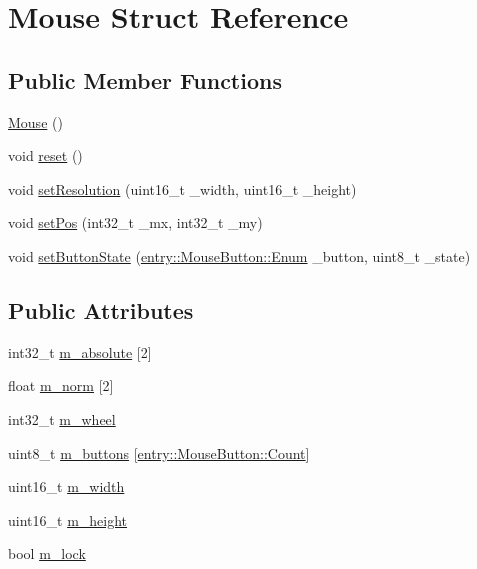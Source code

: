 \hypertarget{struct_mouse}{\section{Mouse Struct Reference}
\label{struct_mouse}
}
\subsection*{Public Member Functions}
\begin{DoxyCompactItemize}
\item 
\hyperlink{struct_mouse_a99024d3700d649ae19c1537b42a3e86d}{Mouse} ()
\item 
void \hyperlink{struct_mouse_aba60ae3aab2142aea9847a3cd59c13a5}{reset} ()
\item 
void \hyperlink{struct_mouse_aec24170b364143a8cca5e36a359e6eef}{set\+Resolution} (uint16\+\_\+t \+\_\+width, uint16\+\_\+t \+\_\+height)
\item 
void \hyperlink{struct_mouse_a8c247e14b22fa38dfae6e250c0e5d3dd}{set\+Pos} (int32\+\_\+t \+\_\+mx, int32\+\_\+t \+\_\+my)
\item 
void \hyperlink{struct_mouse_abd8a223594d0d456d7bb1f67ae176d50}{set\+Button\+State} (\hyperlink{structentry_1_1_mouse_button_a047d99f30fac4b4483eeb96d815fe54e}{entry\+::\+Mouse\+Button\+::\+Enum} \+\_\+button, uint8\+\_\+t \+\_\+state)
\end{DoxyCompactItemize}
\subsection*{Public Attributes}
\begin{DoxyCompactItemize}
\item 
int32\+\_\+t \hyperlink{struct_mouse_a42fdf956f19e9e059ca62812a082653e}{m\+\_\+absolute} \mbox{[}2\mbox{]}
\item 
float \hyperlink{struct_mouse_a1641bb4620edd76fa00092216de31820}{m\+\_\+norm} \mbox{[}2\mbox{]}
\item 
int32\+\_\+t \hyperlink{struct_mouse_a9be7ff2af5255f1fe5645496dc3b63ac}{m\+\_\+wheel}
\item 
uint8\+\_\+t \hyperlink{struct_mouse_aeacb26d4b4ad5b6bb62dccaa4ea82dc1}{m\+\_\+buttons} \mbox{[}\hyperlink{structentry_1_1_mouse_button_a047d99f30fac4b4483eeb96d815fe54ea18eab1694a20b6bed0c85d7fde907a1f}{entry\+::\+Mouse\+Button\+::\+Count}\mbox{]}
\item 
uint16\+\_\+t \hyperlink{struct_mouse_a1685d1fc66a9b6092feaee590c7bd83e}{m\+\_\+width}
\item 
uint16\+\_\+t \hyperlink{struct_mouse_afa714e583237c2a4a1d523ec3b2038ff}{m\+\_\+height}
\item 
bool \hyperlink{struct_mouse_a0c7f95542b778469fd215b224af0bce9}{m\+\_\+lock}
\end{DoxyCompactItemize}


